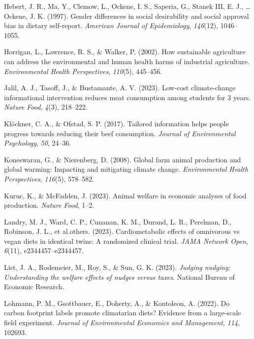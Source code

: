 \documentclass[
  man]{apa6}
\newlength{\cslhangindent}
\newenvironment{CSLReferences}[2] %
 {\begin{list}{}{%
  \setlength{\itemindent}{0pt}
  \setlength{\leftmargin}{0pt}
  \setlength{\parsep}{0pt}
  \ifodd #1
   \setlength{\leftmargin}{\cslhangindent}
   \setlength{\itemindent}{-1\cslhangindent}
  \fi
  \setlength{\itemsep}{#2\baselineskip}}}
 {\end{list}}
\begin{document}
\begin{CSLReferences}{1}{0}
Hebert, J. R., Ma, Y., Clemow, L., Ockene, I. S., Saperia, G., Stanek III, E. J., \ldots{} Ockene, J. K. (1997). Gender differences in social desirability and social approval bias in dietary self-report. \emph{American Journal of Epidemiology}, \emph{146}(12), 1046--1055.

Horrigan, L., Lawrence, R. S., \& Walker, P. (2002). How sustainable agriculture can address the environmental and human health harms of industrial agriculture. \emph{Environmental Health Perspectives}, \emph{110}(5), 445--456.

Jalil, A. J., Tasoff, J., \& Bustamante, A. V. (2023). Low-cost climate-change informational intervention reduces meat consumption among students for 3 years. \emph{Nature Food}, \emph{4}(3), 218--222.

Klöckner, C. A., \& Ofstad, S. P. (2017). Tailored information helps people progress towards reducing their beef consumption. \emph{Journal of Environmental Psychology}, \emph{50}, 24--36.

Koneswaran, G., \& Nierenberg, D. (2008). Global farm animal production and global warming: Impacting and mitigating climate change. \emph{Environmental Health Perspectives}, \emph{116}(5), 578--582.

Kuruc, K., \& McFadden, J. (2023). Animal welfare in economic analyses of food production. \emph{Nature Food}, 1--2.

Landry, M. J., Ward, C. P., Cunanan, K. M., Durand, L. R., Perelman, D., Robinson, J. L., et al.others. (2023). Cardiometabolic effects of omnivorous vs vegan diets in identical twins: A randomized clinical trial. \emph{JAMA Network Open}, \emph{6}(11), e2344457--e2344457.

List, J. A., Rodemeier, M., Roy, S., \& Sun, G. K. (2023). \emph{Judging nudging: Understanding the welfare effects of nudges versus taxes}. National Bureau of Economic Research.

Lohmann, P. M., Gsottbauer, E., Doherty, A., \& Kontoleon, A. (2022). Do carbon footprint labels promote climatarian diets? Evidence from a large-scale field experiment. \emph{Journal of Environmental Economics and Management}, \emph{114}, 102693.


\end{CSLReferences}
\end{document}
